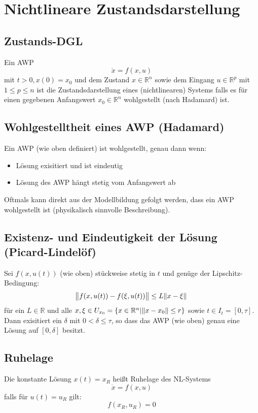 \chapter{Nichtlineare Zustandsdarstellung}
\section{Zustands-DGL}
Ein AWP
\begin{equation}
    \dot{x} = f(x, u)
\end{equation}
mit $t>0, x(0) = x_0$ und dem Zustand $x \in \mathbb{R}^n$ sowie dem Eingang 
$u \in \mathbb{R}^p$ mit $1 \leq p \leq n$ ist die Zustandsdarstellung eines
(nichtlinearen) Systems falls es für einen gegebenen Anfangswert $x_0 \in \mathbb{R}^n$
wohlgestellt (nach Hadamard) ist.

\section{Wohlgestelltheit eines AWP (Hadamard)}
Ein AWP (wie oben definiert) ist wohlgestellt, genau dann wenn:
\begin{itemize}
    \item Lösung exisitiert und ist eindeutig
    \item Lösung des AWP hängt stetig vom Anfangswert ab
\end{itemize}

Oftmals kann direkt aus der Modellbildung gefolgt werden, dass ein AWP wohlgestellt
ist (physikalisch sinnvolle Beschreibung).

\section{Existenz- und Eindeutigkeit der Lösung (Picard-Lindelöf)}
Sei $f(x, u(t))$ (wie oben) stückweise stetig in $t$ und genüge der Lipschitz-Bedingung:
\begin{equation}
    \norm{f(x, u(t)) - f(\xi, u(t))} \leq L \norm{x - \xi}
\end{equation}
für ein $L \in \mathbb{R}$ und alle $x, \xi \in U_{x_0} = \{x \in \mathbb{R}^n | \norm{x - x_0} \leq r\}$
sowie $t \in I_t = [0, \tau]$.
Dann exisitiert ein $\delta$ mit $0 < \delta \leq \tau$, so dass das AWP (wie oben)
genau eine Lösung auf $[0, \delta]$ besitzt.

\section{Ruhelage}
Die konstante Lösung $x(t) = x_R$ heißt Ruhelage des NL-Systems
\begin{equation}
    \dot{x} = f(x, u)
\end{equation}
falls für $u(t)=u_R$ gilt:
\begin{equation}
    f(x_R, u_R) = 0
\end{equation}

